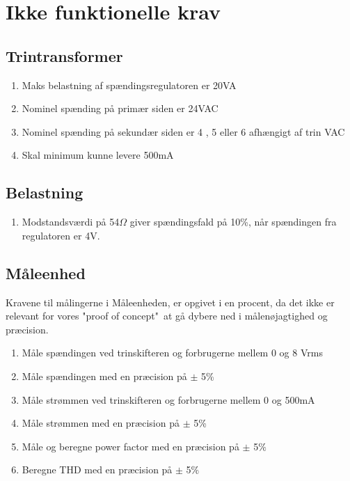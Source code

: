 
\section{Ikke funktionelle krav}

\subsection{Trintransformer}
\begin{enumerate}
	\item Maks belastning af spændingsregulatoren er 20VA
	\item Nominel spænding på primær siden er 24VAC
	\item Nominel spænding på sekundær siden er 4 , 5 eller 6 afhængigt af trin VAC
	\item Skal minimum kunne levere 500mA	
\end{enumerate}

\subsection{Belastning}
\begin{enumerate}
	\item Modstandsværdi på 54$\Omega$ giver spændingsfald på 10\%, når spændingen fra regulatoren er 4V.
\end{enumerate}

\subsection{Måleenhed}
\label{subsec:ME}
Kravene til målingerne i Måleenheden, er opgivet i en procent, da det ikke er relevant for vores "proof of concept"\  at gå dybere ned i målenøjagtighed og præcision. 
\begin{enumerate}
	\item Måle spændingen ved trinskifteren og forbrugerne mellem 0 og 8 Vrms
	\item Måle spændingen med en præcision på $\pm$ 5\%
	\item Måle strømmen ved trinskifteren og forbrugerne mellem 0 og 500mA
	\item Måle strømmen med en præcision på $\pm$ 5\%
	\item Måle og beregne power factor med en præcision på $\pm$ 5$\%$
	\item Beregne THD med en præcision på $\pm$ 5$\%$
\end{enumerate}

